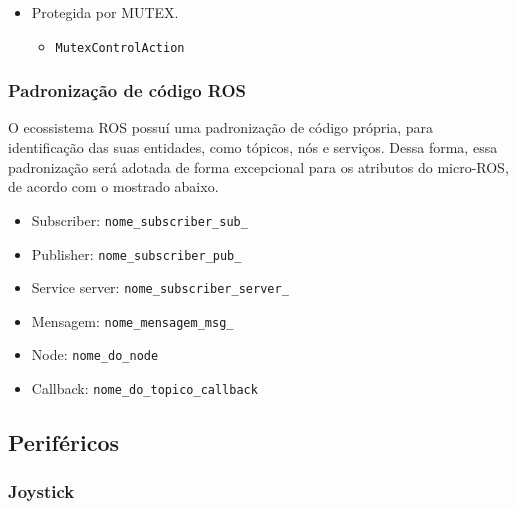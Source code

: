 	
	\begin{itemize}
		\item Protegida por MUTEX.
		\begin{itemize}
			\item \texttt{MutexControlAction}
			
		\end{itemize}
		
	\end{itemize}

\subsubsection*{Padronização de código ROS}

O ecossistema ROS possuí uma padronização de código própria, para identificação das suas entidades, como tópicos, nós e serviços. Dessa forma, essa padronização será adotada de forma excepcional para os atributos do micro-ROS, de acordo com o mostrado abaixo.
	
	\begin{itemize}
		\item Subscriber: \texttt{nome\_subscriber\_sub\_}
		\item Publisher: \texttt{nome\_subscriber\_pub\_}
		\item Service server: \texttt{nome\_subscriber\_server\_}
		\item Mensagem: \texttt{nome\_mensagem\_msg\_}
		\item Node: \texttt{nome\_do\_node}
		\item Callback: \texttt{nome\_do\_topico\_callback}
		
	\end{itemize}

\subsection{Periféricos}

\subsubsection*{Joystick}

